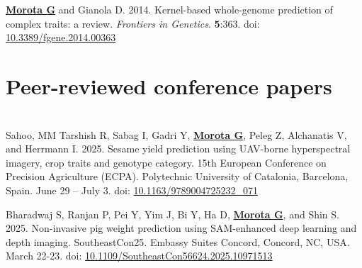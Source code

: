 \documentclass[margin,line,10pt]{res}
\newenvironment{list1}{
  \begin{list}{\ding{113}}{%
      \setlength{\itemsep}{0in}
      \setlength{\parsep}{0in} \setlength{\parskip}{0in}
      \setlength{\topsep}{0in} \setlength{\partopsep}{0in} 
      \setlength{\leftmargin}{0.17in}}}{\end{list}}
\begin{document}
\begin{resume}
\begin{list1}
\end{list1}


\section{}
\begin{list1}

 \item [{\bf 1}.]  {\bf \underline{Morota G}} and Gianola D. 2014. 
  Kernel-based whole-genome prediction of complex traits: a review. \emph{Frontiers in Genetics}. {\bf 5}:363. doi: \textcolor{blue}{\href{http://dx.doi.org/10.3389/fgene.2014.00363}{10.3389/fgene.2014.00363}} 

\end{list1}




\vspace{1.0cm}
\section{\sc Peer-reviewed conference papers}
\vspace{1.5cm}


\section{}
\begin{list1}

  \item [{\bf 13}.]  Sahoo, MM Tarshish R, Sabag I, Gadri Y,  \textbf{\underline{Morota G}}, Peleg Z, Alchanatis V, and Herrmann I. 2025. Sesame yield prediction using UAV-borne hyperspectral imagery, crop traits and genotype category. 15th European Conference on Precision Agriculture (ECPA). Polytechnic University of Catalonia, Barcelona, Spain. June 29 – July 3. doi: \textcolor{blue}{\href{https://doi.org/10.1163/9789004725232\_071}{10.1163/9789004725232\_071}}

  \vspace{0.5cm}

  \item [{\bf 12}.]  Bharadwaj S, Ranjan P, Pei Y, Yim J, Bi Y,  Ha D, \textbf{\underline{Morota G}}, and Shin S. 2025. Non-invasive pig weight prediction using SAM-enhanced deep learning and depth imaging. SoutheastCon25. Embassy Suites Concord, Concord, NC, USA. March 22-23. doi: \textcolor{blue}{\href{https://doi.org/10.1109/SoutheastCon56624.2025.10971513}{10.1109/SoutheastCon56624.2025.10971513}}


\end{list1}
\end{resume}
\end{document}
